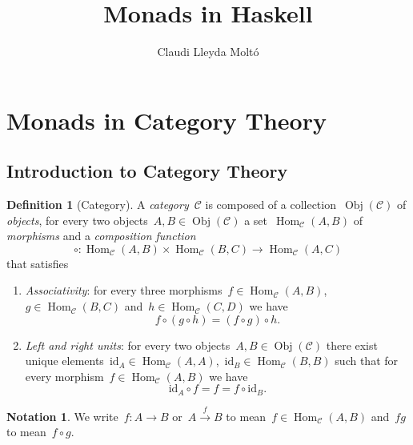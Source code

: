 \documentclass[a4paper]{article}
\title{Monads in Haskell}
\author{Claudi Lleyda Moltó}
\date{}
\theoremstyle{plain}
\theoremstyle{definition}
\newtheorem{definition}[theorem]{Definition}
\newtheorem{notation}[theorem]{Notation}
\DeclareMathOperator{\Obj}{Obj}
\DeclareMathOperator{\Hom}{Hom}
\newcommand{\id}{\mathrm{id}}
\newcommand{\cat}[1]{\mathcal{#1}}
\begin{document}
\maketitle
\tableofcontents
\clearpage
\section{Monads in Category Theory}
\subsection{Introduction to Category Theory}

\begin{definition}[Category]
    \label{def:category}
    A \emph{category}~\(\cat{C}\) is composed of a collection~\(\Obj(\cat{C})\)
    of \emph{objects}, for every two objects~\(A,B\in\Obj(\cat{C})\) a
    set~\(\Hom_{\cat{C}}(A,B)\) of \emph{morphisms} and a \emph{composition function}
    \[
        \circ:\Hom_{\cat{C}}(A,B)\times\Hom_{\cat{C}}(B,C) \longrightarrow
        \Hom_{\cat{C}}(A,C)
    \]
    that satisfies
    \begin{enumerate}
        \item \emph{Associativity}: for every three
            morphisms~\(f\in\Hom_{\cat{C}}(A,B)\),~\(g\in\Hom_{\cat{C}}(B,C)\) and~\(h\in\Hom_{\cat{C}}(C,D)\)
            we have
            \[
                f \circ (g \circ h) = (f \circ g) \circ h.
            \]
        \item \emph{Left and right units}: for every two
            objects~\(A,B\in\Obj(\cat{C})\) there exist unique
            elements~\(\id_{A}\in\Hom_{\cat{C}}(A,A)\),~\(\id_{B}\in\Hom_{\cat{C}}(B,B)\) such that
            for every morphism~\(f\in\Hom_{\cat{C}}(A,B)\) we have
            \[
                \id_{A} \circ f = f = f \circ \id_{B}.
            \]
    \end{enumerate}
\end{definition}

\begin{notation}
    We write~\(f:A\longrightarrow B\) or~\(A\overset{f}{\longrightarrow}B\) to
    mean~\(f\in\Hom_{\cat{C}}(A,B)\) and~\(fg\) to mean~\(f\circ g\).
\end{notation}
\end{document}

